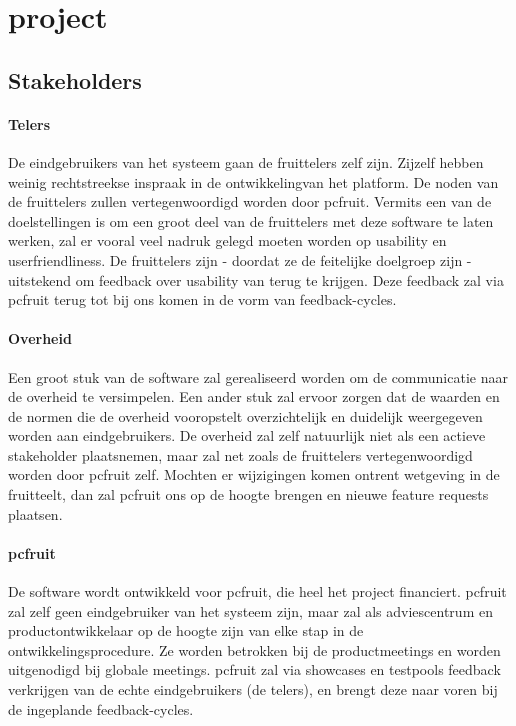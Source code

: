 \section {project}


\subsection {Stakeholders}

\paragraph {Telers} De eindgebruikers van het systeem gaan de fruittelers zelf zijn. Zijzelf hebben weinig rechtstreekse inspraak in de ontwikkelingvan het platform. De noden van de fruittelers zullen vertegenwoordigd worden door pcfruit. Vermits een van de doelstellingen is om een groot deel van de fruittelers met deze software te laten werken, zal er vooral veel nadruk gelegd moeten worden op usability en userfriendliness. De fruittelers zijn - doordat ze de feitelijke doelgroep zijn - uitstekend om feedback over usability van terug te krijgen. Deze feedback zal via pcfruit terug tot bij ons komen in de vorm van feedback-cycles.

\paragraph {Overheid} Een groot stuk van de software zal gerealiseerd worden om de communicatie naar de overheid te versimpelen. Een ander stuk zal ervoor zorgen dat de waarden en de normen die de overheid vooropstelt overzichtelijk en duidelijk weergegeven worden aan eindgebruikers. De overheid zal zelf natuurlijk niet als een actieve stakeholder plaatsnemen, maar zal net zoals de fruittelers vertegenwoordigd worden door pcfruit zelf. Mochten er wijzigingen komen ontrent wetgeving in de fruitteelt, dan zal pcfruit ons op de hoogte brengen en nieuwe feature requests plaatsen.

\paragraph {pcfruit} De software wordt ontwikkeld voor pcfruit, die heel het project financiert. pcfruit zal zelf geen eindgebruiker van het systeem zijn, maar zal als adviescentrum en productontwikkelaar op de hoogte zijn van elke stap in de ontwikkelingsprocedure. Ze worden betrokken bij de productmeetings en worden uitgenodigd bij globale meetings. pcfruit zal via showcases en testpools feedback verkrijgen van de echte eindgebruikers (de telers), en brengt deze naar voren bij de ingeplande feedback-cycles.

